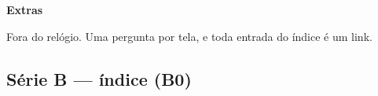 \documentclass{beamer}
\begin{document}
\miniframesoff

{
\specialframe
\begin{frame}[noframenumbering]
    \vspace{0pt}%
    \vfill
    \hfill\begin{minipage}{0.46\textwidth}
        {\Large\bfseries Extras}\par\medskip
        {\normalsize Fora do relógio. Uma pergunta por tela, e toda entrada do índice é um link.\par}
    \end{minipage}\hspace*{6mm}
    \vfill
\end{frame}
}

\subsection{Série B --- índice (B0)}
\end{document}
